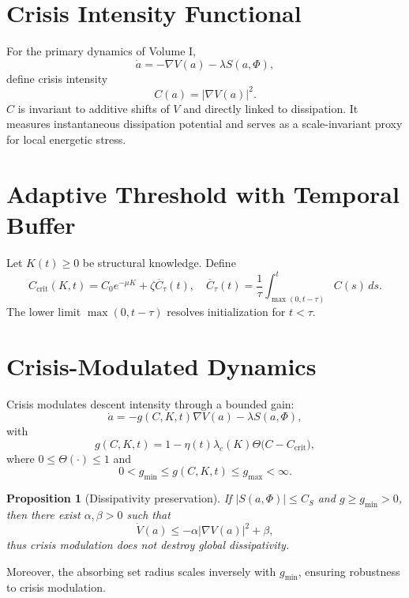 ﻿\documentclass[12pt,a4paper]{article}
\newtheorem{proposition}{Proposition}
\begin{document}
\section{Crisis Intensity Functional}
For the primary dynamics of Volume I,
\begin{equation}
\dot a = -\nabla V(a) - \lambda S(a,\Phi),
\end{equation}
define crisis intensity
\begin{equation}
C(a)=|\nabla V(a)|^2.
\end{equation}
$C$ is invariant to additive shifts of $V$ and directly linked to dissipation. It measures instantaneous dissipation potential and serves as a scale-invariant proxy for local energetic stress.

\section{Adaptive Threshold with Temporal Buffer}
Let $K(t)\ge0$ be structural knowledge. Define
\begin{equation}
C_{\mathrm{crit}}(K,t)=C_0 e^{-\mu K}+\zeta \overline C_{\tau}(t),
\quad
\overline C_{\tau}(t)=\frac{1}{\tau}\int_{\max(0,t-\tau)}^t C(s)\,ds.
\end{equation}
The lower limit $\max(0,t-\tau)$ resolves initialization for $t<\tau$.

\section{Crisis-Modulated Dynamics}
Crisis modulates descent intensity through a bounded gain:
\begin{equation}
\dot a = -g(C,K,t)\nabla V(a)-\lambda S(a,\Phi),
\end{equation}
with
\begin{equation}
g(C,K,t)=1-\eta(t)\lambda_c(K)\Theta\big(C-C_{\mathrm{crit}}\big),
\end{equation}
where $0\le\Theta(\cdot)\le1$ and
\begin{equation}
0<g_{\min}\le g(C,K,t)\le g_{\max}<\infty.
\end{equation}

\begin{proposition}[Dissipativity preservation]
If $|S(a,\Phi)|\le C_S$ and $g\ge g_{\min}>0$, then there exist $\alpha,\beta>0$ such that
\begin{equation}
\dot V(a)\le -\alpha |\nabla V(a)|^2+\beta,
\end{equation}
thus crisis modulation does not destroy global dissipativity.
\end{proposition}
Moreover, the absorbing set radius scales inversely with $g_{\min}$, ensuring robustness to crisis modulation.
\end{document}
